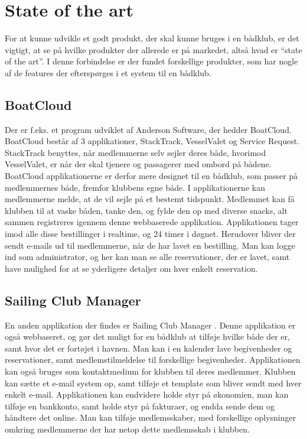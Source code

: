\section{State of the art}

For at kunne udvikle et godt produkt, der skal kunne bruges i en bådklub, er det vigtigt, at se på hvilke
produkter der allerede er på markedet, altså hvad er ``state of the art''. I denne forbindelse er der fundet
forskellige produkter, som har nogle af de features der efterspørges i et system til en bådklub.


\subsection*{BoatCloud}

Der er f.eks. et program udviklet af Anderson Software, der hedder BoatCloud.\citep{BoatCloud} BoatCloud
består af 3 applikationer, StackTrack, VesselValet og Service Request. StackTrack benyttes, når medlemmerne selv sejler
deres både, hvorimod VesselValet, er
når der skal tjenere og passagerer med ombord på bådene. BoatCloud applikationerne er derfor mere designet til
en bådklub, som passer på medlemmernes både, fremfor klubbens egne både. I applikationerne kan medlemmerne
melde, at de vil sejle på et bestemt tidspunkt. Medlemmet kan få klubben til at vaske båden, tanke den, og
fylde den op med diverse snacks, alt sammen registreres igennem denne webbaserede applikation. Applikationen
tager imod alle disse bestillinger i realtime, og 24 timer i døgnet. Herudover bliver der sendt e-mails ud til
medlemmerne, når de har lavet en bestilling. Man kan logge ind som administrator, og her kan man se alle
reservationer, der er lavet, samt have mulighed for at se yderligere detaljer om hver enkelt reservation.


\subsection*{Sailing Club Manager}

En anden applikation der findes er Sailing Club Manager \citep{SailClub}. Denne applikation er også
webbaseret, og gør det muligt for en bådklub at tilføje hvilke både der er, samt hvor det er fortøjet i
havnen. Man kan i en kalender lave begivenheder og reservationer, samt medlemstilmeldelse til forskellige
begivenheder. Applikationen kan også bruges som kontaktmedium for klubben til deres medlemmer. Klubben kan
sætte et e-mail system op, samt tilføje et template som bliver sendt med hver enkelt e-mail. Applikationen kan
endvidere holde styr på økonomien, man kan tilføje en bankkonto, samt  holde styr på fakturaer, og endda sende
dem og håndtere det online. Man kan tilføje medlemsskaber, med forskellige oplysninger omkring medlemmerne der
har netop dette medlemsskab i klubben.

